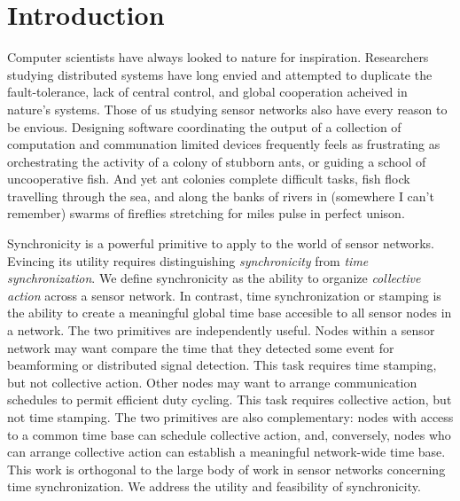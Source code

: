 \section{Introduction}

Computer scientists have always looked to nature for inspiration.
Researchers studying distributed systems have long envied and attempted to
duplicate the fault-tolerance, lack of central control, and global
cooperation acheived in nature's systems.  Those of us studying sensor
networks also have every reason to be envious.  Designing software
coordinating the output of a collection of computation and communation
limited devices frequently feels as frustrating as orchestrating the activity 
of a colony of stubborn ants, or guiding a school of uncooperative fish.  And
yet ant colonies complete difficult tasks, fish flock travelling through the
sea, and along the banks of rivers in (somewhere I can't
remember) swarms of fireflies stretching for miles pulse in perfect unison.

Synchronicity is a powerful primitive to apply to the world of sensor
networks.  Evincing its utility requires distinguishing {\em synchronicity}
from {\em time synchronization}.  We define synchronicity as the ability to
organize {\em collective action} across a sensor network.  In contrast, time
synchronization or stamping is the ability to create a meaningful global time
base accesible to all sensor nodes in a network.  The two primitives are
independently useful.  Nodes within a sensor network may want compare the
time that they detected some event for beamforming or distributed signal
detection.  This task requires time stamping, but not collective action.
Other nodes may want to arrange communication schedules to permit efficient
duty cycling.  This task requires collective action, but not time stamping.
The two primitives are also complementary: nodes with access to a common time
base can schedule collective action, and, conversely, nodes who can arrange
collective action can establish a meaningful network-wide time base.  This
work is orthogonal to the large body of work in sensor networks concerning
time synchronization.  We address the utility and feasibility of
synchronicity.

